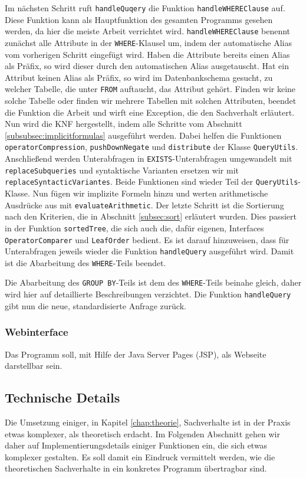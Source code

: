 Im nächsten Schritt ruft \verb|handleQuqery| die Funktion \verb|handleWHEREClause| auf. Diese Funktion kann als Hauptfunktion des gesamten Programms gesehen werden, da hier die meiste Arbeit verrichtet wird. \verb|handleWHEREClause| benennt zunächst alle Attribute in der \verb|WHERE|-Klausel um, indem der automatische Alias vom vorherigen Schritt eingefügt wird. Haben die Attribute bereits einen Alias als Präfix, so wird dieser durch den automatischen Alias ausgetauscht. Hat ein Attribut keinen Alias als Präfix, so wird im Datenbankschema gesucht, zu welcher Tabelle, die unter \verb|FROM| auftaucht, das Attribut gehört. Finden wir keine solche Tabelle oder finden wir mehrere Tabellen mit solchen Attributen, beendet die Funktion die Arbeit und wirft eine Exception, die den Sachverhalt erläutert. Nun wird die KNF hergestellt, indem alle Schritte vom Abschnitt \ref{subsubsec:implicitformulas} ausgeführt werden. Dabei helfen die Funktionen \verb|operatorCompression|, \verb|pushDownNegate| und \verb|distribute| der Klasse \verb|QueryUtils|. Anschließend werden Unterabfragen in \verb|EXISTS|-Unterabfragen umgewandelt mit \verb|replaceSubqueries| und syntaktische Varianten ersetzen wir mit \verb|replaceSyntacticVariantes|. Beide Funktionen sind wieder Teil der \verb|QueryUtils|-Klasse. Nun fügen wir implizite Formeln hinzu und werten arithmetische Ausdrücke aus mit \verb|evaluateArithmetic|.
Der letzte Schritt ist die Sortierung nach den Kriterien, die in Abschnitt \ref{subsec:sort} erläutert wurden. Dies passiert in der Funktion \verb|sortedTree|, die sich auch die, dafür eigenen, Interfaces \verb|OperatorComparer| und \verb|LeafOrder| bedient. Es ist darauf hinzuweisen, dass für Unterabfragen jeweils wieder die Funktion \verb|handleQuery| ausgeführt wird. Damit ist die Abarbeitung des \verb|WHERE|-Teils beendet.

Die Abarbeitung des \verb|GROUP BY|-Teils ist dem des \verb|WHERE|-Teils beinahe gleich, daher wird hier auf detaillierte Beschreibungen verzichtet. Die Funktion \verb|handleQuery| gibt nun die neue, standardisierte Anfrage zurück.

\subsubsection{Webinterface}

Das Programm soll, mit Hilfe der Java Server Pages (JSP), als Webseite darstellbar sein. 


\subsection{Technische Details}

Die Umsetzung einiger, in Kapitel \ref{chap:theorie}, Sachverhalte ist in der Praxis etwas komplexer, als theoretisch erdacht. Im Folgenden Abschnitt gehen wir daher auf Implementierungsdetails einiger Funktionen ein, die sich etwas komplexer gestalten. Es soll damit ein Eindruck vermittelt werden, wie die theoretischen Sachverhalte in ein konkretes Programm übertragbar sind.

